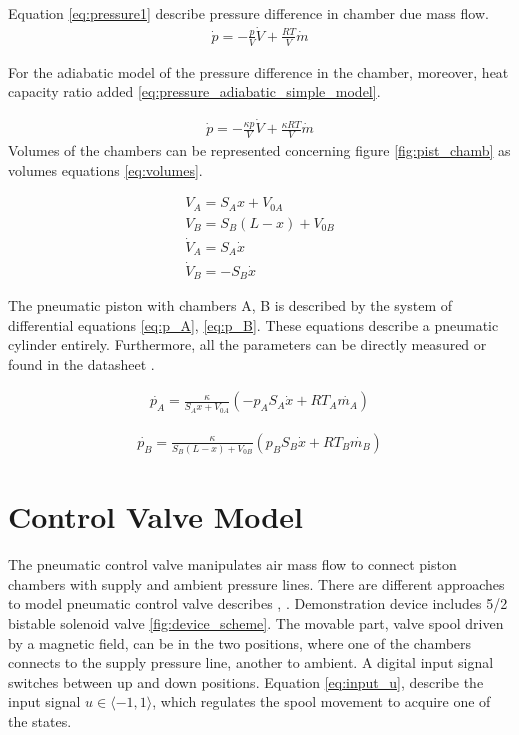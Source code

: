 Equation \ref{eq:pressure1} describe pressure difference in chamber due
mass flow.
\begin{align}
    \dot{p} = - \frac{p}{V}\dot{V} + \frac{RT}{V}\dot{m}
    \label{eq:pressure1}
\end{align}


For the adiabatic model of the pressure difference in the chamber,
moreover, heat capacity ratio added
\ref{eq:pressure_adiabatic_simple_model}.

\begin{align}
    \dot{p} = - \frac{\kappa p}{V}\dot{V} + \frac{\kappa RT}{V}\dot{m}
    \label{eq:pressure_adiabatic_simple_model}
\end{align}
Volumes of the chambers can be represented concerning figure
\ref{fig:pist_chamb} as volumes equations \ref{eq:volumes}.

\begin{align}
    V_A = S_A x + V_{0A} \\
    V_B = S_B (L-x) + V_{0B} \\
    \dot{V}_A = S_A \dot{x} \\
    \dot{V}_B = - S_B \dot{x}
    \label{eq:volumes}
\end{align}

The pneumatic piston with chambers A, B is described by the system of
differential equations \ref{eq:p_A}, \ref{eq:p_B}. These equations describe a pneumatic
cylinder entirely. Furthermore, all the parameters can be directly measured
or found in the datasheet \cite{piston_datasheet}.

\begin{align}
    \dot{p_A} = \frac{\kappa}{S_A x + V_{0A}} \left(- p_A S_A\dot{x} +
    RT_A\dot{m_A} \right)
    \label{eq:p_A}
\end{align}

\begin{align}
    \dot{p_B} = \frac{\kappa}{S_B (L-x) + V_{0B}} \left(p_B S_B\dot{x} +
    RT_B\dot{m_B} \right)
    \label{eq:p_B}
\end{align}


\section{Control Valve Model}
The pneumatic control valve manipulates air mass flow to connect piston
chambers with supply and ambient pressure lines. There are different
approaches to model pneumatic control valve describes \cite{isermann_mech},
\cite{valves_chambers}.
Demonstration device includes 5/2 bistable solenoid valve
\ref{fig:device_scheme}. The movable part, valve spool driven by a magnetic
field, can be in the two positions, where one of the chambers connects to
the supply pressure line, another to ambient. A digital input signal
switches between up and down positions. Equation \ref{eq:input_u},
describe the input signal $u \in \langle-1,1\rangle$, which regulates the
spool movement to acquire one of
the states. 

